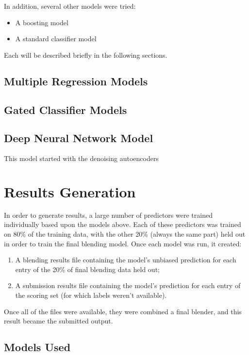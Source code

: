 \documentclass{article}
\begin{document}
In addition, several other models were tried:

\begin{itemize}
\item A boosting model
\item A standard classifier model
\end{itemize}

Each will be described briefly in the following sections.

\subsection{Multiple Regression Models}

\subsection{Gated Classifier Models}

\subsection{Deep Neural Network Model}

This model started with the denoising autoencoders

\section{Results Generation}

In order to generate results, a large number of predictors were trained individually based upon the models above.  Each of these predictors was trained on 80\% of the training data, with the other 20\% (always the same part) held out in order to train the final blending model.  Once each model was run, it created:

\begin{enumerate}
\item A blending results file containing the model's unbiased prediction for each entry of the 20\% of final blending data held out;
\item A submission results file containing the model's prediction for each entry of the scoring set (for which labels weren't available).
\end{enumerate}

Once all of the files were available, they were combined a final blender, and this result became the submitted output.

\subsection{Models Used}
\end{document}
